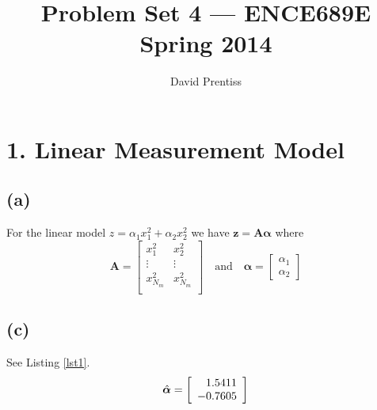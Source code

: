 \documentclass[fleqn, letterpaper]{tufte-handout}
\title{Problem Set 4 --- ENCE689E Spring 2014}
\author{David Prentiss}
\begin{document}
\maketitle

\section{1. Linear Measurement Model}
\subsection{(a)}
For the linear model $z = \alpha_1x_1^2+\alpha_2x_2^2$ we have $\bm{z} = \bm{A}\bm{\alpha}$ where 
\[
        \bm{A} =
        \begin{bmatrix}
                x^2_1 & x^2_2 \\
                \vdots & \vdots \\
                x^2_{N_m} & x^2_{N_m} \\
        \end{bmatrix}
        \quad \text{and} \quad
        \bm{\alpha} =
        \begin{bmatrix}
                \alpha_1 \\ \alpha_2
        \end{bmatrix}
\]
\subsection{(c)}
See Listing \ref{lst1}.
\[
        \hat{\bm{\alpha}} =
        \left[
                \begin{array}{r@{.}l}
                        1&5411 \\ -0&7605
                \end{array}
        \right]
\]
{\small
\begin{minipage}{\linewidth}
        
\end{minipage}
}
\end{document}
